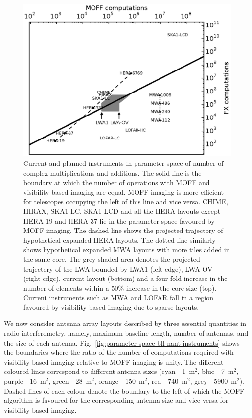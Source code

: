 \documentclass[a4paper,fleqn,usenatbib]{mnras}
\begin{document}
\begin{figure}
  \includegraphics[width=\columnwidth]{figure11}
  \caption{Current and planned instruments in parameter space of number of complex multiplications and additions. The solid line is the boundary at which the number of operations with MOFF and visibility-based imaging are equal. MOFF imaging is more efficient for telescopes occupying the left of this line and vice versa. CHIME, HIRAX, SKA1-LC, SKA1-LCD and all the HERA layouts except HERA-19 and HERA-37 lie in the parameter space favoured by MOFF imaging. The dashed line shows the projected trajectory of hypothetical expanded HERA layouts. The dotted line similarly shows hypothetical expanded MWA layouts with more tiles added in the same core. The grey shaded area denotes the projected trajectory of the LWA bounded by LWA1 (left edge), LWA-OV (right edge), current layout (bottom) and a four-fold increase in the number of elements within a 50\% increase in the core size (top). Current instruments such as MWA and LOFAR fall in a region favoured by visibility-based imaging due to sparse layouts.}
  \label{fig:parameter-space-computations-instruments}
\end{figure}

We now consider antenna array layouts described by three essential quantities in radio interferometry, namely, maximum baseline length, number of antennas, and the size of each antenna. Fig.~\ref{fig:parameter-space-bll-nant-instruments} shows the boundaries where the ratio of the number of computations required with visibility-based imaging relative to MOFF imaging is unity. The different coloured lines correspond to different antenna sizes (cyan - 1~m$^2$, blue - 7~m$^2$, purple - 16~m$^2$, green - 28~m$^2$, orange - 150~m$^2$, red - 740~m$^2$, grey - 5900~m$^2$). Dashed lines of each colour denote the boundary to the left of which the MOFF algorithm is favoured for the corresponding antenna size and vice versa for visibility-based imaging.
\end{document}
